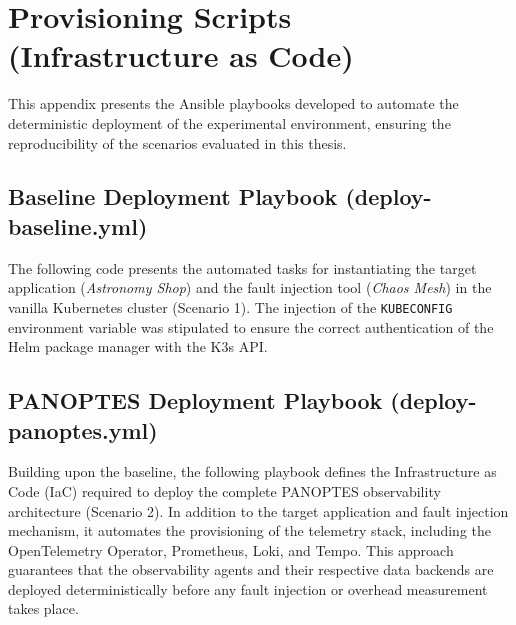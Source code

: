 \chapter{Provisioning Scripts (Infrastructure as Code)}
\label{appendix:b}

This appendix presents the Ansible playbooks developed to automate the deterministic deployment of the experimental environment, ensuring the reproducibility of the scenarios evaluated in this thesis.

\section{Baseline Deployment Playbook (deploy-baseline.yml)}
\label{sec:playbook-baseline}

The following code presents the automated tasks for instantiating the target application (\textit{Astronomy Shop}) and the fault injection tool (\textit{Chaos Mesh}) in the vanilla Kubernetes cluster (Scenario 1). The injection of the \texttt{KUBECONFIG} environment variable was stipulated to ensure the correct authentication of the Helm package manager with the K3s API.



\section{PANOPTES Deployment Playbook (deploy-panoptes.yml)}
\label{sec:playbook-panoptes}

Building upon the baseline, the following playbook defines the Infrastructure as Code (IaC) required to deploy the complete PANOPTES observability architecture (Scenario 2). In addition to the target application and fault injection mechanism, it automates the provisioning of the telemetry stack, including the OpenTelemetry Operator, Prometheus, Loki, and Tempo. This approach guarantees that the observability agents and their respective data backends are deployed deterministically before any fault injection or overhead measurement takes place.



